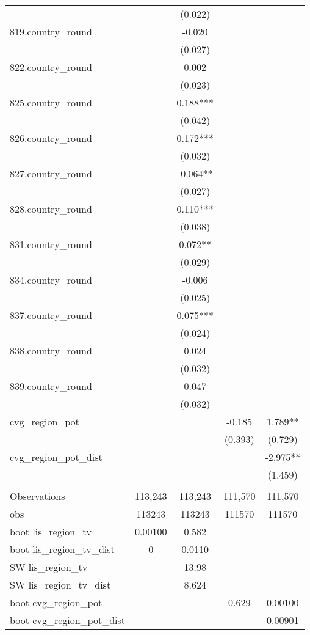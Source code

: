 \documentclass[]{article}
\begin{document}
\begin{tabular}{lcccc}
 &  & (0.022) &  &  \\
819.country\_round &  & -0.020 &  &  \\
 &  & (0.027) &  &  \\
822.country\_round &  & 0.002 &  &  \\
 &  & (0.023) &  &  \\
825.country\_round &  & 0.188*** &  &  \\
 &  & (0.042) &  &  \\
826.country\_round &  & 0.172*** &  &  \\
 &  & (0.032) &  &  \\
827.country\_round &  & -0.064** &  &  \\
 &  & (0.027) &  &  \\
828.country\_round &  & 0.110*** &  &  \\
 &  & (0.038) &  &  \\
831.country\_round &  & 0.072** &  &  \\
 &  & (0.029) &  &  \\
834.country\_round &  & -0.006 &  &  \\
 &  & (0.025) &  &  \\
837.country\_round &  & 0.075*** &  &  \\
 &  & (0.024) &  &  \\
838.country\_round &  & 0.024 &  &  \\
 &  & (0.032) &  &  \\
839.country\_round &  & 0.047 &  &  \\
 &  & (0.032) &  &  \\
cvg\_region\_pot &  &  & -0.185 & 1.789** \\
 &  &  & (0.393) & (0.729) \\
cvg\_region\_pot\_dist &  &  &  & -2.975** \\
 &  &  &  & (1.459) \\
 &  &  &  &  \\
Observations & 113,243 & 113,243 & 111,570 & 111,570 \\
obs & 113243 & 113243 & 111570 & 111570 \\
boot lis\_region\_tv & 0.00100 & 0.582 &  &  \\
boot lis\_region\_tv\_dist & 0 & 0.0110 &  &  \\
SW lis\_region\_tv &  & 13.98 &  &  \\
SW lis\_region\_tv\_dist &  & 8.624 &  &  \\
boot cvg\_region\_pot &  &  & 0.629 & 0.00100 \\
 boot cvg\_region\_pot\_dist &  &  &  & 0.00901 \\ \hline
\end{tabular}
\end{document}
